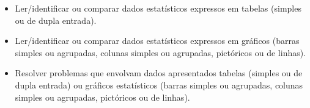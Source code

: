 \begin{multicols}{2}
\begin{enumerate}

\begin{itemize}
    \item Ler/identificar ou comparar dados estatísticos expressos em tabelas
(simples ou de dupla entrada).

    \item Ler/identificar ou comparar dados estatísticos expressos em gráficos
(barras simples ou agrupadas, colunas simples ou agrupadas, pictóricos
ou de linhas).

    \item Resolver problemas que envolvam dados apresentados tabelas (simples ou
de dupla entrada) ou gráficos estatísticos (barras simples ou agrupadas,
colunas simples ou agrupadas, pictóricos ou de linhas).
\end{itemize}


\end{enumerate}
\end{multicols}
